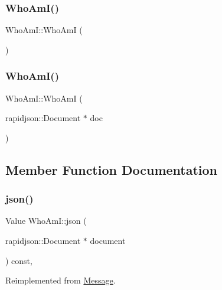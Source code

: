 \subsubsection{\texorpdfstring{Who\+Am\+I()}{WhoAmI()}\hspace{0.1cm}{\footnotesize\ttfamily [1/2]}}
{\footnotesize\ttfamily Who\+Am\+I\+::\+Who\+AmI (\begin{DoxyParamCaption}{ }\end{DoxyParamCaption})}

\mbox{\label{classWhoAmI_aa6d2d42633a1fd76e4aa76442f39c29a}} 
\subsubsection{\texorpdfstring{Who\+Am\+I()}{WhoAmI()}\hspace{0.1cm}{\footnotesize\ttfamily [2/2]}}
{\footnotesize\ttfamily Who\+Am\+I\+::\+Who\+AmI (\begin{DoxyParamCaption}\item[{rapidjson\+::\+Document $\ast$}]{doc }\end{DoxyParamCaption})\hspace{0.3cm}{\ttfamily [explicit]}}



\subsection{Member Function Documentation}
\mbox{\label{classWhoAmI_a998c4b21d6235a84f15bd994b76be59d}} 
\subsubsection{\texorpdfstring{json()}{json()}}
{\footnotesize\ttfamily Value Who\+Am\+I\+::json (\begin{DoxyParamCaption}\item[{rapidjson\+::\+Document $\ast$}]{document }\end{DoxyParamCaption}) const\hspace{0.3cm}{\ttfamily [override]}, {\ttfamily [virtual]}}



Reimplemented from \mbox{\hyperlink{classMessage_a6f8e3ac2eed3a8afe9400fcd5b3447b2}{Message}}.



